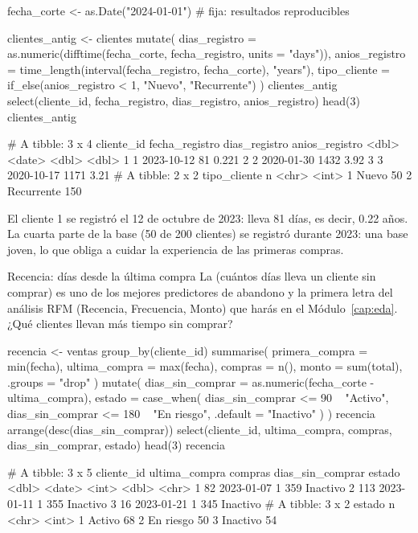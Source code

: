 \begin{rcode}
fecha_corte <- as.Date("2024-01-01")     # fija: resultados reproducibles

clientes_antig <- clientes %
  mutate(
    dias_registro  = as.numeric(difftime(fecha_corte, fecha_registro,
                                         units = "days")),
    anios_registro = time_length(interval(fecha_registro, fecha_corte),
                                 "years"),
    tipo_cliente   = if_else(anios_registro < 1, "Nuevo", "Recurrente")
  )
clientes_antig %
  select(cliente_id, fecha_registro, dias_registro, anios_registro) %
  head(3)
clientes_antig %
\end{rcode}
\begin{rsalida}
# A tibble: 3 x 4
  cliente_id fecha_registro dias_registro anios_registro
       <dbl> <date>                 <dbl>          <dbl>
1          1 2023-10-12                81          0.221
2          2 2020-01-30              1432          3.92 
3          3 2020-10-17              1171          3.21 
# A tibble: 2 x 2
  tipo_cliente     n
  <chr>        <int>
1 Nuevo           50
2 Recurrente     150
\end{rsalida}

El cliente 1 se registró el 12 de octubre de 2023: lleva 81 días, es decir,
0.22 años. La cuarta parte de la base (50 de 200 clientes) se registró
durante 2023: una base joven, lo que obliga a cuidar la experiencia de las
primeras compras.

\begin{ejemplo}{Recencia: días desde la última compra}
La  (cuántos días lleva un cliente sin comprar) es uno de
los mejores predictores de abandono y la primera letra del análisis RFM
(Recencia, Frecuencia, Monto) que harás en el Módulo~\ref{cap:eda}. ¿Qué
clientes llevan más tiempo sin comprar?
\end{ejemplo}

\begin{rcode}
recencia <- ventas %
  group_by(cliente_id) %
  summarise(
    primera_compra = min(fecha),
    ultima_compra  = max(fecha),
    compras        = n(),
    monto          = sum(total),
    .groups = "drop"
  ) %
  mutate(
    dias_sin_comprar = as.numeric(fecha_corte - ultima_compra),
    estado = case_when(
      dias_sin_comprar <= 90  ~ "Activo",
      dias_sin_comprar <= 180 ~ "En riesgo",
      .default                = "Inactivo"
    )
  )
recencia %
  arrange(desc(dias_sin_comprar)) %
  select(cliente_id, ultima_compra, compras, dias_sin_comprar, estado) %
  head(3)
recencia %
\end{rcode}
\begin{rsalida}
# A tibble: 3 x 5
  cliente_id ultima_compra compras dias_sin_comprar estado  
       <dbl> <date>          <int>            <dbl> <chr>   
1         82 2023-01-07          1              359 Inactivo
2        113 2023-01-11          1              355 Inactivo
3         16 2023-01-21          1              345 Inactivo
# A tibble: 3 x 2
  estado        n
  <chr>     <int>
1 Activo       68
2 En riesgo    50
3 Inactivo     54
\end{rsalida}

